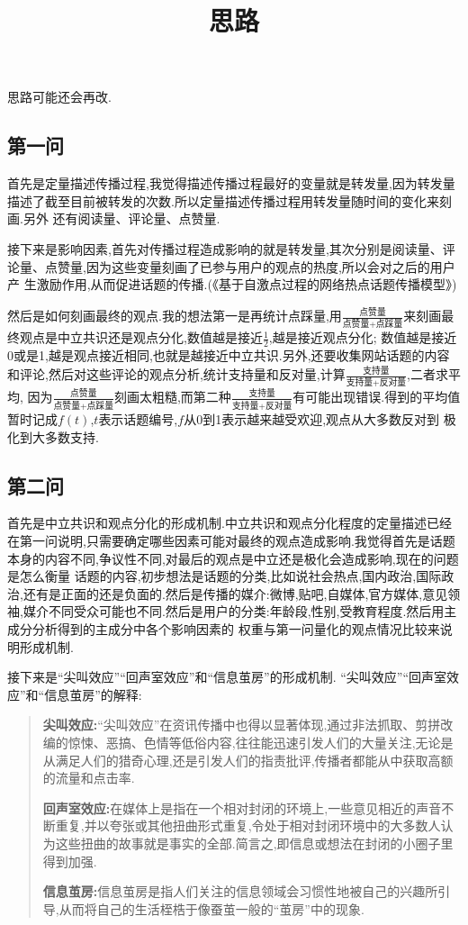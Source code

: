\documentclass[12pt,a4paper,oneside]{ctexart}
\title{思路}
\date{}
\author{}
\begin{document}
  \maketitle

  思路可能还会再改.

\subsection*{第一问}

首先是定量描述传播过程,我觉得描述传播过程最好的变量就是转发量,因为转发量描述了截至目前被转发的次数.所以定量描述传播过程用转发量随时间的变化来刻画.另外
还有阅读量、评论量、点赞量.

接下来是影响因素,首先对传播过程造成影响的就是转发量,其次分别是阅读量、评论量、点赞量,因为这些变量刻画了已参与用户的观点的热度,所以会对之后的用户产
生激励作用,从而促进话题的传播.(《基于自激点过程的网络热点话题传播模型》)

然后是如何刻画最终的观点.我的想法第一是再统计点踩量,用$\frac{\mbox{点赞量}}{\mbox{点赞量$+$点踩量}}$来刻画最终观点是中立共识还是观点分化,数值越是接近$\frac{1}{2}$,越是接近观点分化;
数值越是接近0或是1,越是观点接近相同,也就是越接近中立共识.另外,还要收集网站话题的内容和评论,然后对这些评论的观点分析,统计支持量和反对量,计算$\frac{\mbox{支持量}}{\mbox{支持量$+$反对量}}$,二者求平均,
因为$\frac{\mbox{点赞量}}{\mbox{点赞量$+$点踩量}}$刻画太粗糙,而第二种$\frac{\mbox{支持量}}{\mbox{支持量$+$反对量}}$有可能出现错误.得到的平均值暂时记成$f(t)$,$t$表示话题编号,$f$从0到1表示越来越受欢迎,观点从大多数反对到
极化到大多数支持.

\subsection*{第二问}

首先是中立共识和观点分化的形成机制.中立共识和观点分化程度的定量描述已经在第一问说明,只需要确定哪些因素可能对最终的观点造成影响.我觉得首先是话题本身的内容不同,争议性不同,对最后的观点是中立还是极化会造成影响,现在的问题是怎么衡量
话题的内容,初步想法是话题的分类,比如说社会热点,国内政治,国际政治,还有是正面的还是负面的.然后是传播的媒介:微博,贴吧,自媒体,官方媒体,意见领袖,媒介不同受众可能也不同.然后是用户的分类:年龄段,性别,受教育程度.然后用主成分分析得到的主成分中各个影响因素的
权重与第一问量化的观点情况比较来说明形成机制.

接下来是``尖叫效应''``回声室效应''和``信息茧房''的形成机制. ``尖叫效应''``回声室效应''和``信息茧房''的解释:
\begin{quotation}
  \textbf{尖叫效应:}``尖叫效应''在资讯传播中也得以显著体现,通过非法抓取、剪拼改编的惊悚、恶搞、色情等低俗内容,往往能迅速引发人们的大量关注,无论是从满足人们的猎奇心理,还是引发人们的指责批评,传播者都能从中获取高额的流量和点击率.

  \textbf{回声室效应:}在媒体上是指在一个相对封闭的环境上,一些意见相近的声音不断重复,并以夸张或其他扭曲形式重复,令处于相对封闭环境中的大多数人认为这些扭曲的故事就是事实的全部.简言之,即信息或想法在封闭的小圈子里得到加强.

  \textbf{信息茧房:}信息茧房是指人们关注的信息领域会习惯性地被自己的兴趣所引导,从而将自己的生活桎梏于像蚕茧一般的``茧房''中的现象.
\end{quotation}
\end{document}
